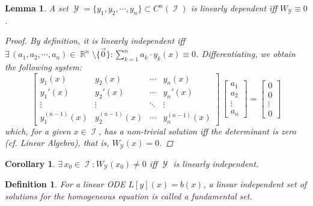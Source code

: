\documentclass[12pt]{article}
\newcommand{\Exist}[1]{\exists\,{#1}:}
\DeclareMathOperator{\R}{\mathbb{R}}
\DeclareMathOperator{\I}{\mathcal{I}}
\DeclareMathOperator{\Y}{\mathcal{Y}}
\newcommand{\der}[2][n]{{#2}^{(#1)}}
\newtheorem{definition}[theorem]{Definition}
\newtheorem{lemma}[theorem]{Lemma}
\newtheorem{corollary}[theorem]{Corollary}
\begin{document}
\begin{lemma}
  A set $\Y=\{y_1,y_2,\cdots,y_n\}\subset C^n(\I)$ is linearly dependent iff $W_{\Y}\equiv 0$.
  \begin{proof}
    By definition, it is linearly independent iff $\Exist{(a_1,a_2,\cdots,a_n)\in\R^n\setminus\{\vec{0}\}}\sum_{k=1}^n a_k\cdot y_k(x)\equiv 0$. Differentiating, we obtain the following system: $$\begin{bmatrix}
      y_1(x)&y_2(x)&\cdots&y_n(x)\\
      y_1'(x)&y_2'(x)&\cdots&y_n'(x)\\
      \vdots&\vdots&\ddots&\vdots\\
      \der[n-1]{y}_1(x)&\der[n-1]{y}_2(x)&\cdots&\der[n-1]{y}_n(x)
    \end{bmatrix}\,\begin{bmatrix}
      a_1\\a_2\\\vdots\\a_n
    \end{bmatrix}=\begin{bmatrix}
      0\\0\\\vdots\\0
    \end{bmatrix}$$ which, for a given $x\in\I$, has a non-trivial solution iff the determinant is zero (cf. Linear Algebra), that is, $W_{\Y}(x)=0$.
  \end{proof}
\end{lemma}

\begin{corollary}
  $\Exist{x_0\in\I}W_{\Y}(x_0)\neq 0$ iff $\Y$ is linearly independent.
\end{corollary}

\begin{definition}
  For a linear ODE $L[y](x)=b(x)$, a linear independent set of solutions for the homogeneous equation is called a fundamental set.
\end{definition}
\end{document}
